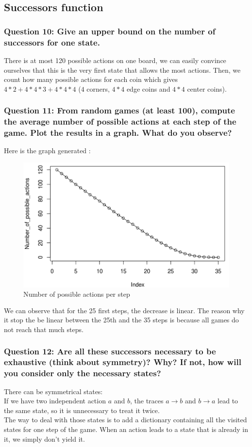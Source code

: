 \documentclass[a4paper,10pt]{article}
\begin{document}
			\subsection{Successors function}
				\subsubsection{Question 10: Give an upper bound on the number of successors for one state.}
					There is at most 120 possible actions on one board, we can easily convince ourselves that this is the very first state that allows the most actions. Then, we count how many possible actions for each coin which gives $4*2+4*4*3+4*4*4$ ($4$ corners, $4*4$ edge coins and $4*4$ center coins).
				\subsubsection{Question 11: From random games (at least 100), compute the average number of possible
actions at each step of the game. Plot the results in a graph. What do you observe?}
					Here is the graph generated :
					\begin{figure}[h!]
						\centering
							\includegraphics[scale=0.4]{GraphPossActions.png}
						\caption{Number of possible actions per step}
						\label{fig:server_connection}	
					\end{figure}
					We can observe that for the 25 first steps, the decrease is linear. The reason why it stop the be linear between the 25th and the 35 steps is because all games do not reach that much steps.
					
				\subsubsection{Question 12: Are all these successors necessary to be exhaustive (think about symmetry)? Why? If not, how will you consider only the necessary states?}
					There can be symmetrical states:\\
					If we have two independent action $a$ and $b$, the traces $a\rightarrow b$ and $b\rightarrow a$ lead to the same state, so it is unnecessary to treat it twice.\\
					The way to deal with those states is to add a dictionary containing all the visited states for one step of the game. When an action leads to a state that is already in it, we simply don't yield it.
\end{document}
